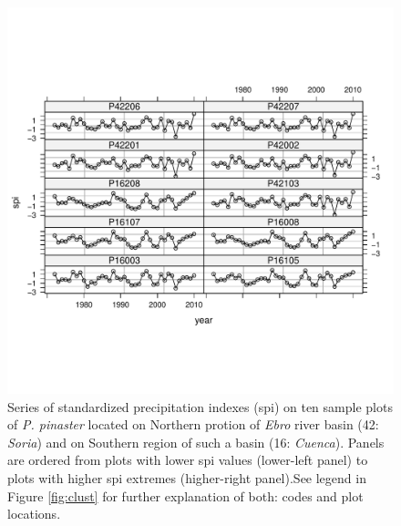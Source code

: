 \documentclass[review,authoryear]{elsarticle}
\begin{document}
\clearpage
\begin{figure}\centering
\includegraphics[scale=0.8,trim=20mm 0mm 20mm 0mm]{spis} 
\caption{Series of standardized precipitation indexes (spi) on ten
  sample plots of \textit{P. pinaster} located on Northern protion of
  \textit{Ebro} river basin (42: \textit{Soria}) and on Southern
  region of such a basin (16: \textit{Cuenca}). Panels are ordered
  from plots with lower spi values (lower-left panel) to plots with
  higher spi extremes (higher-right panel).See legend in Figure
  \ref{fig:clust} for further explanation of both: codes and plot
  locations.}
\label{fig:spis} 
\end{figure}
\end{document}
